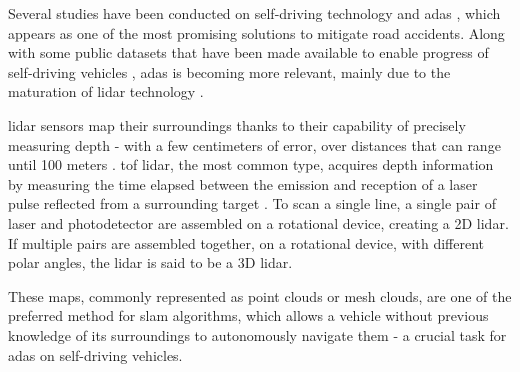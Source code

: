 \documentclass[extendedabs]{recpad2k}
\begin{document}
Several studies have been conducted on self-driving technology and \Gls{adas} \cite{Fridman2017, ADAS1, Bimbraw2015}, which appears as one of the most promising solutions to mitigate road accidents. Along with some public datasets that have been made available to enable progress of self-driving vehicles \cite{Geiger2012}, \gls{adas} is becoming more relevant, mainly due to the maturation of \gls{lidar} technology \cite{Sullivan2016}. 

\gls{lidar} sensors map their surroundings thanks to their capability of precisely measuring depth - with a few centimeters of error, over distances that can range until 100 meters \cite{vlp16, Sullivan2016}. \gls{tof} \gls{lidar}, the most common type, acquires depth information by measuring the time elapsed between the emission and reception of a laser pulse reflected from a surrounding target \cite{Sullivan2016}. To scan a single line, a single pair of laser and photodetector are assembled on a rotational device, creating a 2D \gls{lidar}. If multiple pairs are assembled together, on a rotational device, with different polar angles, the \gls{lidar} is said to be a 3D \gls{lidar}.

These maps, commonly represented as point clouds or mesh clouds, are one of the preferred method for \gls{slam} algorithms, which allows a vehicle without previous knowledge of its surroundings to autonomously navigate them - a crucial task for \gls{adas} on self-driving vehicles.







 


\end{document}
